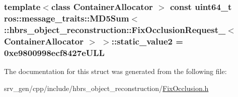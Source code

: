 \hypertarget{structros_1_1message__traits_1_1_m_d5_sum_3_01_1_1hbrs__object__reconstruction_1_1_fix_occlusionfc5eaa692137555a256b57cb60ad53de_a1793d697d9c6f2e5d84dcf85edef10e1}{
\subsubsection[{static\-\_\-value2}]{\setlength{\rightskip}{0pt plus 5cm}template$<$class Container\-Allocator $>$ const uint64\-\_\-t ros\-::message\-\_\-traits\-::\-M\-D5\-Sum$<$ \-::{\bf hbrs\-\_\-object\-\_\-reconstruction\-::\-Fix\-Occlusion\-Request\-\_\-}$<$ \-Container\-Allocator $>$ $>$\-::{\bf static\-\_\-value2} = 0xe9800998ecf8427e\-U\-L\-L}}\label{structros_1_1message__traits_1_1_m_d5_sum_3_01_1_1hbrs__object__reconstruction_1_1_fix_occlusionfc5eaa692137555a256b57cb60ad53de_a1793d697d9c6f2e5d84dcf85edef10e1}


\-The documentation for this struct was generated from the following file\-:\begin{DoxyCompactItemize}
\item 
srv\-\_\-gen/cpp/include/hbrs\-\_\-object\-\_\-reconstruction/\hyperlink{_fix_occlusion_8h}{\-Fix\-Occlusion.\-h}\end{DoxyCompactItemize}

